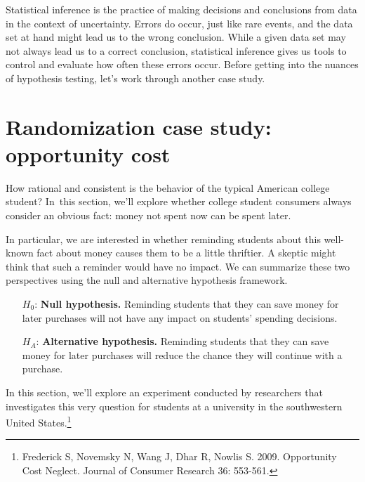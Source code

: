 Statistical inference is the practice of making decisions and conclusions from data in the context of uncertainty. Errors do occur, just like rare events, and the data set at hand might lead us to the wrong conclusion. While a given data set may not always lead us to a correct conclusion, statistical inference gives us tools to control and evaluate how often these errors occur. Before getting into the nuances of hypothesis testing, let's work through another case study.



\textPE{\newpage}

\section{Randomization case study: opportunity cost}
\label{caseStudyOpportunityCost}

How rational and consistent is the behavior of the typical American college student? In~this section, we'll explore whether college student consumers always consider an obvious fact: money not spent now can be spent later.

In particular, we are interested in whether reminding students about this well-known fact about money causes them to be a little thriftier. A skeptic might think that such a reminder would have no impact. We can summarize these two perspectives using the null and alternative hypothesis framework.
\begin{itemize}
\setlength{\itemsep}{0mm}
\item[$H_0$:] \textbf{Null hypothesis.} Reminding students that they can save money for later purchases will not have any impact on students' spending decisions.
\item[$H_A$:] \textbf{Alternative hypothesis.} Reminding students that they can save money for later purchases will reduce the chance they will continue with a purchase.
\end{itemize}
In this section, we'll explore an experiment conducted by researchers that investigates this very question for students at a university in the southwestern United States.\footnote{Frederick S, Novemsky N, Wang J, Dhar R, Nowlis S. 2009. Opportunity Cost Neglect. Journal of Consumer Research 36: 553-561.}

